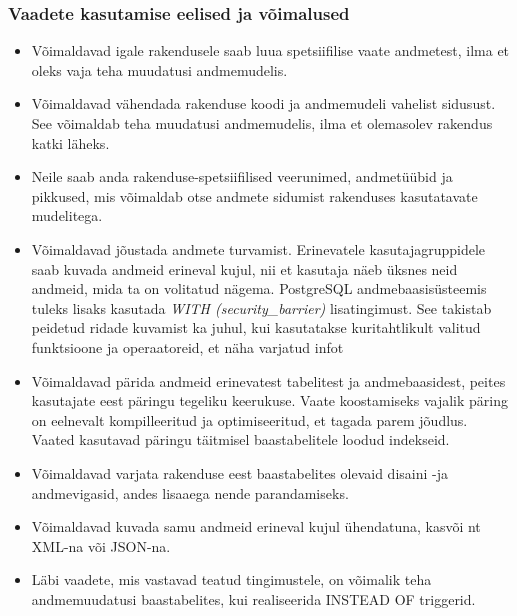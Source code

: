 \documentclass[a4paper,12pt]{article} %
\begin{document}
\subsubsection{Vaadete kasutamise eelised ja võimalused}
\begin{itemize}
\item Võimaldavad igale rakendusele saab luua spetsiifilise vaate andmetest, ilma et oleks vaja teha muudatusi andmemudelis.
\item Võimaldavad vähendada rakenduse koodi ja andmemudeli vahelist sidusust.
See võimaldab teha muudatusi andmemudelis, ilma et olemasolev rakendus katki läheks.
\item Neile saab anda rakenduse-spetsiifilised veerunimed, andmetüübid ja pikkused, mis võimaldab otse andmete sidumist rakenduses kasutatavate mudelitega.
\item Võimaldavad jõustada andmete turvamist. Erinevatele kasutajagruppidele saab kuvada andmeid erineval kujul, nii et kasutaja näeb üksnes neid andmeid, mida ta on volitatud nägema. PostgreSQL andmebaasisüsteemis tuleks lisaks kasutada \textit{WITH (security\_barrier)} lisatingimust. See takistab peidetud ridade kuvamist ka juhul, kui kasutatakse kuritahtlikult valitud funktsioone ja operaatoreid, et näha varjatud infot \cite{PostgreSQLRulesAndPrivileges}
\item Võimaldavad pärida andmeid erinevatest tabelitest ja andmebaasidest, peites kasutajate eest päringu tegeliku keerukuse. Vaate koostamiseks vajalik päring on eelnevalt kompilleeritud ja optimiseeritud, et tagada parem jõudlus. Vaated kasutavad päringu täitmisel baastabelitele loodud indekseid.
\item Võimaldavad varjata rakenduse eest baastabelites olevaid disaini -ja andmevigasid, andes lisaaega nende parandamiseks.
\item Võimaldavad kuvada samu andmeid erineval kujul ühendatuna, kasvõi nt XML-na või JSON-na.
\item Läbi vaadete, mis vastavad teatud tingimustele, on võimalik teha andmemuudatusi baastabelites, kui realiseerida INSTEAD OF triggerid.
\end{itemize}
\cite[lk 172-173]{BuildingTheAgileDatabase}
\end{document}
